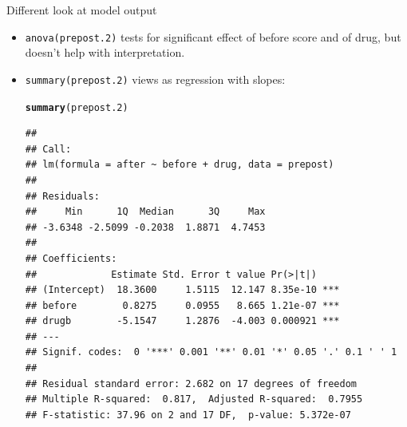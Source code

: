 \documentclass[unknownkeysallowed]{beamer}\usepackage[]{graphicx}\usepackage[]{color}
\makeatletter
\newcommand{\hlstd}[1]{\textcolor[rgb]{0.345,0.345,0.345}{#1}}%
\newcommand{\hlkwd}[1]{\textcolor[rgb]{0.737,0.353,0.396}{\textbf{#1}}}%
\newenvironment{kframe}{%
 \def\at@end@of@kframe{}%
 \ifinner\ifhmode%
  \def\at@end@of@kframe{\end{minipage}}%
  \begin{minipage}{\columnwidth}%
 \fi\fi%
 \def\FrameCommand##1{\hskip\@totalleftmargin \hskip-\fboxsep
 \colorbox{shadecolor}{##1}\hskip-\fboxsep
     \hskip-\linewidth \hskip-\@totalleftmargin \hskip\columnwidth}%
 \MakeFramed {\advance\hsize-\width
   \@totalleftmargin\z@ \linewidth\hsize
   \@setminipage}}%
 {\par\unskip\endMakeFramed%
 \at@end@of@kframe}
\newenvironment{knitrout}{}{} %
\makeatother
\begin{document}
\begin{frame}[fragile]{Different look at model output}
  
  \begin{itemize}
  \item \texttt{anova(prepost.2)} tests for significant effect of
    before score and of drug, but doesn't help with interpretation.
  \item \texttt{summary(prepost.2)} views as regression with slopes:
    
    \begin{scriptsize}
\begin{knitrout}
\color{fgcolor}\begin{kframe}
\begin{alltt}
\hlkwd{summary}\hlstd{(prepost.2)}
\end{alltt}
\begin{verbatim}
## 
## Call:
## lm(formula = after ~ before + drug, data = prepost)
## 
## Residuals:
##     Min      1Q  Median      3Q     Max 
## -3.6348 -2.5099 -0.2038  1.8871  4.7453 
## 
## Coefficients:
##             Estimate Std. Error t value Pr(>|t|)    
## (Intercept)  18.3600     1.5115  12.147 8.35e-10 ***
## before        0.8275     0.0955   8.665 1.21e-07 ***
## drugb        -5.1547     1.2876  -4.003 0.000921 ***
## ---
## Signif. codes:  0 '***' 0.001 '**' 0.01 '*' 0.05 '.' 0.1 ' ' 1
## 
## Residual standard error: 2.682 on 17 degrees of freedom
## Multiple R-squared:  0.817,	Adjusted R-squared:  0.7955 
## F-statistic: 37.96 on 2 and 17 DF,  p-value: 5.372e-07
\end{verbatim}
\end{kframe}
\end{knitrout}
    \end{scriptsize}
  \end{itemize}
  
\end{frame}
\end{document}
